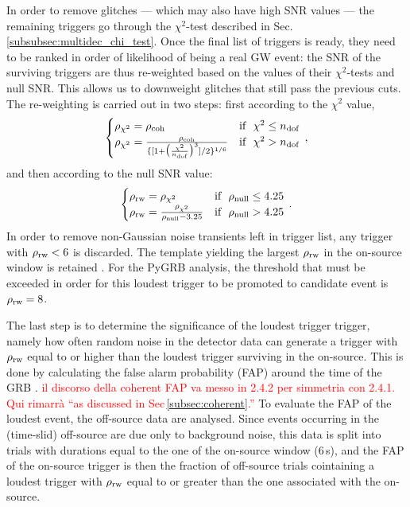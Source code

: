 \documentclass[binding=0.6cm, LaM]{sapthesis}
\newcommand{\fpg}[1]{\textcolor{red}{#1} }
\begin{document}
	In order to remove glitches --- which may also have high SNR values --- the remaining triggers go through the $\chi^2$-test described in Sec.\,\ref{subsubsec:multidec_chi_test}.
	Once the final list of triggers is ready, they need to be ranked in order of likelihood of being a real GW event:
	the SNR of the surviving triggers are thus re-weighted based on the values of their $\chi^2$-tests and null SNR.
	This allows us to downweight glitches that still pass the previous cuts.
	The re-weighting is carried out in two steps: first according to the $\chi^2$ value,
        \begin{equation}
          \begin{cases}
            \rho_{\chi^2} =  \rho_{\rm coh} & \text{if}~~ \chi^2 \leq n_{\rm dof} \\
            \rho_{\chi^2} =  {{\rho_{\rm coh}}  \over {\{[1+ \big( {{\chi^2} \over {n_{\rm dof}}} \big)^3 ]/2\}^{1/6}}} & \text{if}~~ \chi^2 > n_{\rm dof}
          \end{cases}\,,
        \end{equation}
	and then according to the null SNR value:
        \begin{equation}
          \begin{cases}
            \rho_{\rm rw} = \rho_{\chi^2} & \text{if}~~ \rho_{\rm null} \leq 4.25\\
            \rho_{\rm rw} = {{ \rho_{\chi^2}}  \over {\rho_{\rm null} - 3.25}} & \text{if}~~ \rho_{\rm null} > 4.25
          \end{cases}\,.
        \end{equation}
	In order to remove non-Gaussian noise transients left in trigger list, 
	any trigger with $\rho_{\rm rw}<6$ is discarded.
	The template yielding the largest $\rho_{\rm rw}$ 
	in the on-source window is retained \cite{46}. 
	For the {\ttfamily PyGRB} analysis, the threshold that must be exceeded in order for this loudest trigger to be promoted to candidate event is $\rho_{\rm rw} = 8$.

	The last step is to determine the significance of the loudest trigger trigger,
	namely how often random noise in the detector data can generate a trigger with $\rho_{\rm rw}$ equal to or higher than the loudest trigger surviving in the on-source.
	This is done by calculating the false alarm probability (FAP) around the time of the GRB \cite{46}. \fpg{il discorso della coherent FAP va messo in 2.4.2 per simmetria con 2.4.1.  Qui rimarr\`a ``as discussed in Sec\,\ref{subsec:coherent}.''}
	To evaluate the FAP of the loudest event, the off-source data are analysed.
	Since events occurring in the (time-slid) off-source are due only to background noise, 
	this data is split into trials with durations equal to the one of the on-source window (6\,s), 
	and the FAP of the on-source trigger is then the fraction of off-source trials cointaining a loudest trigger with $\rho_{\rm rw}$ equal to or greater than the one associated with the on-source.
\end{document}
